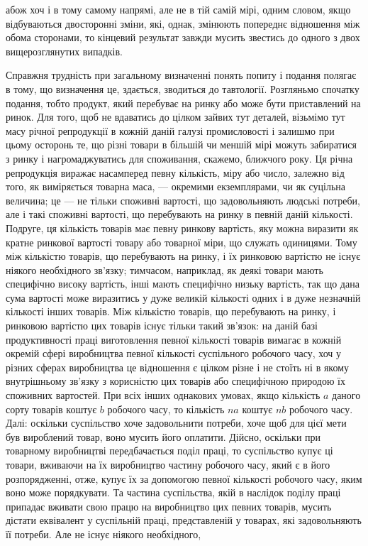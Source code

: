\enlargethispage{\baselineskip}
\parcont{}  %
абож хоч і в тому самому напрямі, але не в тій самій мірі,
одним словом, якщо відбуваються двосторонні зміни, які, однак,
змінюють попереднє відношення між обома сторонами, то кінцевий
результат завжди мусить звестись до одного з двох
вищерозглянутих випадків.

Справжня трудність при загальному визначенні понять попиту
і подання полягає в тому, що визначення це, здається, зводиться
до тавтології. Розгляньмо спочатку подання, тобто продукт,
який перебуває на ринку або може бути приставлений на
ринок. Для того, щоб не вдаватись до цілком зайвих тут
деталей, візьмімо тут масу річної репродукції в кожній даній
галузі промисловості і залишмо при цьому осторонь те, що різні
товари в більшій чи меншій мірі можуть забиратися з ринку
і нагромаджуватись для споживання, скажемо, ближчого року.
Ця річна репродукція виражає насамперед певну кількість, міру
або число, залежно від того, як виміряється товарна маса, —
окремими екземплярами, чи як суцільна величина; це — не тільки
споживні вартості, що задовольняють людські потреби, але і такі
споживні вартості, що перебувають на ринку в певній даній
кількості. Подруге, ця кількість товарів має певну ринкову
вартість, яку можна виразити як кратне ринкової вартості товару
або товарної міри, що служать одиницями. Тому між
кількістю товарів, що перебувають на ринку, і їх ринковою
вартістю не існує ніякого необхідного зв’язку; тимчасом, наприклад,
як деякі товари мають специфічно високу вартість,
інші мають специфічно низьку вартість, так що дана сума вартості
може виразитись у дуже великій кількості одних і в дуже
незначній кількості інших товарів. Між кількістю товарів, що
перебувають на ринку, і ринковою вартістю цих товарів існує
тільки такий зв’язок: на даній базі продуктивності праці виготовлення
певної кількості товарів вимагає в кожній окремій
сфері виробництва певної кількості суспільного робочого часу,
хоч у різних сферах виробництва це відношення є цілком різне
і не стоїть ні в якому внутрішньому зв’язку з корисністю цих
товарів або специфічною природою їх споживних вартостей.
При всіх інших однакових умовах, якщо кількість $a$ даного
сорту товарів коштує $b$ робочого часу, то кількість $na$ коштує
$nb$ робочого часу. Далі: оскільки суспільство хоче задовольнити
потреби, хоче щоб для цієї мети був вироблений товар, воно мусить
його оплатити. Дійсно, оскільки при товарному виробництві
передбачається поділ праці, то суспільство купує ці товари,
вживаючи на їх виробництво частину робочого часу, який
є в його розпорядженні, отже, купує їх за допомогою певної
кількості робочого часу, яким воно може порядкувати. Та частина
суспільства, якій в наслідок поділу праці припадає вживати
свою працю на виробництво цих певних товарів, мусить
дістати еквівалент у суспільній праці, представленій у товарах,
які задовольняють її потреби. Але не існує ніякого необхідного,
\parbreak{}  %

